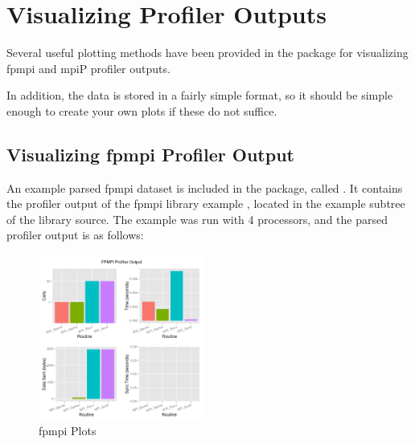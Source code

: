 \section{Visualizing Profiler Outputs}

Several useful plotting methods have been provided in the  package for visualizing fpmpi and mpiP profiler outputs.  

In addition, the data is stored in a fairly simple format, so it should be simple enough to create your own plots if these do not suffice.

\subsection{Visualizing fpmpi Profiler Output}

An example parsed fpmpi dataset is included in the  package, called .  It contains the profiler output of the fpmpi library example , located in the example subtree of the library source.  The example was run with 4 processors, and the parsed profiler output is as follows:

\begin{figure}[h]
  \centering
  \includegraphics[width=0.485\textwidth]{include/pics/fpmpi}
  \caption{fpmpi Plots}
  \label{fig:fpmpi}
\end{figure}

